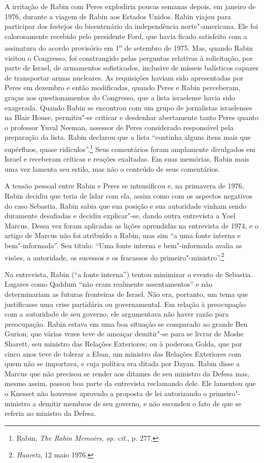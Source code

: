 A irritação de Rabin com Peres explodiria poucas semanas depois, em
janeiro de 1976, durante a viagem de Rabin aos Estados Unidos. Rabin
viajou para participar dos festejos do bicentenário da independência
norte"-americana. Ele foi calorosamente recebido pelo presidente Ford,
que havia ficado satisfeito com a assinatura do acordo provisório
em 1\textsuperscript{o} de setembro de 1975. Mas, quando Rabin
visitou o Congresso, foi constrangido pelas perguntas relativas à
solicitação, por parte de Israel, de armamentos sofisticados, inclusive
de mísseis balísticos capazes de transportar armas nucleares. As
requisições haviam sido apresentadas por Peres em dezembro e então
modificadas, quando Peres e Rabin perceberam, graças aos questionamentos
do Congresso, que a lista israelense havia sido exagerada. Quando Rabin
se encontrou com um grupo de jornalistas israelenses na Blair House,
permitiu"-se criticar e desdenhar abertamente tanto Peres quanto o
professor Yuval Neeman, assessor de Peres considerado responsável pela
preparação da lista. Rabin declarou que a lista ``continha alguns itens
mais que supérfluos, quase ridículos''.\footnote{Rabin,
\emph{The Rabin Memoirs}, \emph{op}. \emph{cit}., p. 277.} Seus comentários
foram amplamente divulgados em Israel e receberam críticas e reações
exaltadas. Em suas memórias, Rabin mais uma vez lamenta seu estilo, mas
não o conteúdo de seus comentários.

A tensão pessoal entre Rabin e Peres se intensificou e, na primavera de
1976, Rabin decidiu que teria de lidar com ela, assim como com os
aspectos negativos do caso Sebastia. Rabin sabia que sua posição e sua
autoridade vinham sendo duramente desafiadas e decidiu explicar"-se, dando
outra entrevista a Yoel Marcus. Dessa vez foram aplicadas as lições
aprendidas na entrevista de 1974, e o artigo de Marcus não foi atribuído
a Rabin, mas sim ``a uma fonte interna e bem"-informada''. Seu título:
``Uma fonte interna e bem"-informada avalia as visões, a autoridade, os
sucessos e os fracassos do primeiro"-ministro''.\footnote{\emph{Haaretz}, 12 maio 1976.}

Na entrevista, Rabin (``a fonte interna'') tentou minimizar o evento
de Sebastia. Lugares como Qaddum ``não eram realmente assentamentos'' e
não determinariam as futuras fronteiras de Israel. Não era, portanto, um
tema que justificasse uma crise partidária ou governamental. Em relação
à preocupação com a autoridade de seu governo, ele argumentava não haver
razão para preocupação. Rabin estava em uma boa situação se
comparado ao grande Ben Gurion, que várias vezes teve de ameaçar
demitir"-se para se livrar de Moshe Sharett, seu ministro das Relações
Exteriores; ou à poderosa Golda, que por cinco anos teve de tolerar a
Eban, um ministro das Relações Exteriores com quem não se importava, e
cuja política era ditada por Dayan. Rabin disse a Marcus que não precisou
se render aos ditames de seu ministro da Defesa mas, mesmo assim,
passou boa parte da entrevista reclamando dele. Ele lamentou que o
Knesset não houvesse aprovado a proposta de lei autorizando o primeiro"-ministro
a demitir membros de seu governo, e não escondeu o fato de que
se referia ao ministro da Defesa.


